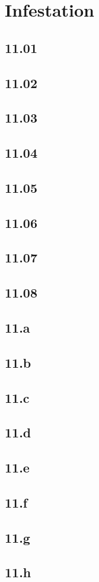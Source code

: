 \part{Infestation}
 \chapter{11.01}
 \chapter{11.02}
 \chapter{11.03}
 \chapter{11.04}
 \chapter{11.05}
 \chapter{11.06}
 \chapter{11.07}
 \chapter{11.08}
 \chapter{11.a}
 \chapter{11.b}
 \chapter{11.c}
 \chapter{11.d}
 \chapter{11.e}
 \chapter{11.f}
 \chapter{11.g}
 \chapter{11.h}

















